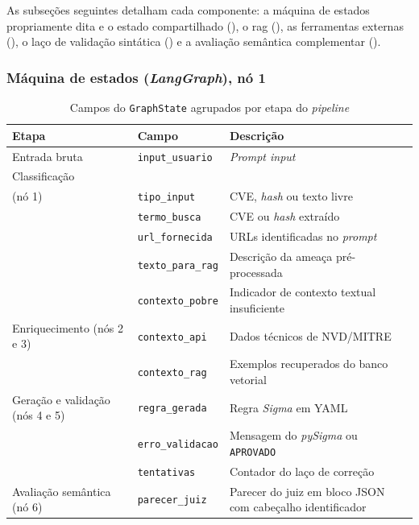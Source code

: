As subseções seguintes detalham cada componente: a máquina de estados propriamente dita e o estado compartilhado (), o \gls{rag} (), as ferramentas externas (), o laço de validação sintática () e a avaliação semântica complementar ().

\subsubsection{Máquina de estados (\textit{LangGraph}), nó 1}

\begin{table}[H]
	\centering
	\caption{Campos do \texttt{GraphState} agrupados por etapa do \textit{pipeline}}
	\label{tab:graphstate}
	\small
	\begin{tabular}{@{} p{2.8cm} p{4cm} p{6.5cm} @{}}
		\toprule
		\textbf{Etapa} & \textbf{Campo} & \textbf{Descrição} \\
		\midrule
		Entrada bruta
		& \texttt{input\_usuario}
		& \textit{Prompt input}\\
		\addlinespace
		Classificação \\
		(nó 1)
		& \texttt{tipo\_input}
		& CVE, \textit{hash} ou texto livre \\
		& \texttt{termo\_busca}
		& CVE ou \textit{hash} extraído \\
		& \texttt{url\_fornecida}
		& URLs identificadas no \textit{prompt} \\
		& \texttt{texto\_para\_rag}
		& Descrição da ameaça pré-processada \\
		& \texttt{contexto\_pobre}
		& Indicador de contexto textual insuficiente \\
		\addlinespace
		Enriquecimento (nós 2 e 3)
		& \texttt{contexto\_api}
		& Dados técnicos de NVD/MITRE \\
		& \texttt{contexto\_rag}
		& Exemplos recuperados do banco vetorial \\
		\addlinespace
		Geração e validação (nós 4 e 5)
		& \texttt{regra\_gerada}
		& Regra \textit{Sigma} em YAML \\
		& \texttt{erro\_validacao}
		& Mensagem do \textit{pySigma} ou \texttt{APROVADO} \\
		& \texttt{tentativas}
		& Contador do laço de correção \\
		\addlinespace
		Avaliação semântica (nó 6)
		& \texttt{parecer\_juiz}
		& Parecer do juiz em bloco JSON com cabeçalho identificador \\
		\bottomrule
	\end{tabular}
	
	\fonte{}
\end{table}

